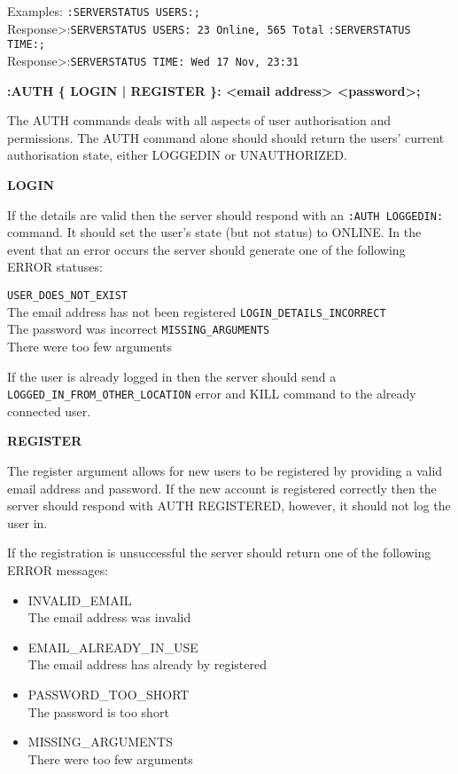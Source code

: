 Examples:
\texttt{:SERVERSTATUS USERS:;} \\
Response>:\texttt{SERVERSTATUS USERS: 23 Online, 565 Total}
\texttt{:SERVERSTATUS TIME:;} \\
Response>:\texttt{SERVERSTATUS TIME: Wed 17 Nov, 23:31}

{\bf :AUTH \{ LOGIN | REGISTER \}: <email address> <password>;}

The AUTH commands deals with all aspects of user authorisation and permissions. The AUTH command alone should should return the users' current authorisation state, either LOGGEDIN or UNAUTHORIZED.

{\bf LOGIN}

If the details are valid then the server should respond with an \texttt{:AUTH LOGGEDIN:} command. It should set the user’s state (but not status) to ONLINE.
In the event that an error occurs the server should generate one of the following ERROR statuses:

\texttt{USER_DOES_NOT_EXIST}\\
The email address has not been registered
\texttt{LOGIN_DETAILS_INCORRECT} \\
The password was incorrect
\texttt{MISSING_ARGUMENTS} \\
There were too few arguments

If the user is already logged in then the server should send a \texttt{LOGGED_IN_FROM_OTHER_LOCATION} error and KILL command to the already connected user.

{\bf REGISTER}

The register argument allows for new users to be registered by providing a valid email address and password. If the new account is registered correctly then the server should respond with AUTH REGISTERED, however, it should not log the user in. 

If the registration is unsuccessful the server should return one of the following ERROR messages:

\begin{itemize}

\item{INVALID_EMAIL \\
The email address was invalid}

\item{EMAIL_ALREADY_IN_USE \\
The email address has already by registered}

\item{PASSWORD_TOO_SHORT \\
The password is too short}

\item{MISSING_ARGUMENTS	\\
There were too few arguments}

\end{itemize}

